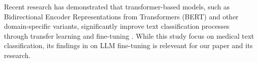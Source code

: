 \documentclass{article}
\begin{document}
Recent research has demonstrated that transformer-based models, such as
Bidirectional Encoder Representations from Transformers (BERT) and other domain-specific variants,
significantly improve text classification processes through transfer learning and fine-tuning \cite{Nazyrova2024}.
While this study focus on medical text classification, its findings in on LLM fine-tuning is releveant for our
paper and its research.





\end{document}
